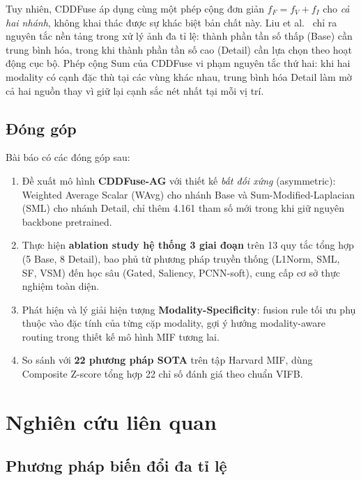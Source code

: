 \documentclass[12pt,a4paper]{article}
\begin{document}
Tuy nhiên, CDDFuse áp dụng cùng một phép cộng đơn giản $f_F = f_V + f_I$ cho
\emph{cả hai nhánh}, không khai thác được sự khác biệt bản chất này. Liu et
al.~\cite{liu2018survey} chỉ ra nguyên tắc nền tảng trong xử lý ảnh đa tỉ lệ:
thành phần tần số thấp (Base) cần trung bình hóa, trong khi thành phần tần số cao
(Detail) cần lựa chọn theo hoạt động cục bộ. Phép cộng Sum của CDDFuse vi phạm
nguyên tắc thứ hai: khi hai modality có cạnh đặc thù tại các vùng khác nhau,
trung bình hóa Detail làm mờ cả hai nguồn thay vì giữ lại cạnh sắc nét nhất tại
mỗi vị trí.

\subsection{Đóng góp}

Bài báo có các đóng góp sau:
\begin{enumerate}\itemsep1pt
  \item Đề xuất mô hình \textbf{CDDFuse-AG} với thiết kế \emph{bất đối xứng}
        (asymmetric): Weighted Average Scalar (WAvg) cho nhánh Base và
        Sum-Modified-Laplacian (SML) cho nhánh Detail, chỉ thêm 4.161 tham số
        mới trong khi giữ nguyên backbone pretrained.
  \item Thực hiện \textbf{ablation study hệ thống 3 giai đoạn} trên 13 quy tắc
        tổng hợp (5 Base, 8 Detail), bao phủ từ phương pháp truyền thống (L1Norm,
        SML, SF, VSM) đến học sâu (Gated, Saliency, PCNN-soft), cung cấp cơ sở
        thực nghiệm toàn diện.
  \item Phát hiện và lý giải hiện tượng \textbf{Modality-Specificity}: fusion
        rule tối ưu phụ thuộc vào đặc tính của từng cặp modality, gợi ý hướng
        modality-aware routing trong thiết kế mô hình MIF tương lai.
  \item So sánh với \textbf{22 phương pháp SOTA} trên tập Harvard MIF, dùng
        Composite Z-score tổng hợp 22 chỉ số đánh giá theo chuẩn VIFB.
\end{enumerate}

\section{Nghiên cứu liên quan}
\label{sec:related}

\subsection{Phương pháp biến đổi đa tỉ lệ}
\end{document}

